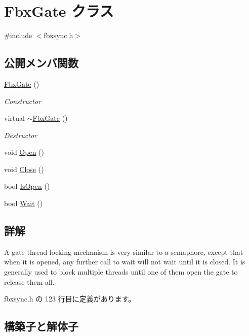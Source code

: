 \hypertarget{class_fbx_gate}{}\section{Fbx\+Gate クラス}
\label{class_fbx_gate}


{\ttfamily \#include $<$fbxsync.\+h$>$}

\subsection*{公開メンバ関数}
\begin{DoxyCompactItemize}
\item 
\hyperlink{class_fbx_gate_a0bfa381894e420784ea2cee86d5f8662}{Fbx\+Gate} ()
\begin{DoxyCompactList}\small\item\em Constructor \end{DoxyCompactList}\item 
virtual \hyperlink{class_fbx_gate_a588ebab279f8bd182bc0a1aeb6001554}{$\sim$\+Fbx\+Gate} ()
\begin{DoxyCompactList}\small\item\em Destructor \end{DoxyCompactList}\item 
void \hyperlink{class_fbx_gate_acd9a45eb0ef7d06f2a4a7f5954555310}{Open} ()
\item 
void \hyperlink{class_fbx_gate_aa91ba9c41757e0065d400f254a5175ee}{Close} ()
\item 
bool \hyperlink{class_fbx_gate_a96baa45cb4fa4a655201355601b6bc47}{Is\+Open} ()
\item 
bool \hyperlink{class_fbx_gate_ad3d9e530f43a6f446c2d09364153c918}{Wait} ()
\end{DoxyCompactItemize}


\subsection{詳解}
A gate thread locking mechanism is very similar to a semaphore, except that when it is opened, any further call to wait will not wait until it is closed. It is generally used to block multiple threads until one of them open the gate to release them all. 

 fbxsync.\+h の 123 行目に定義があります。



\subsection{構築子と解体子}
\mbox{\label{class_fbx_gate_a0bfa381894e420784ea2cee86d5f8662}} 
